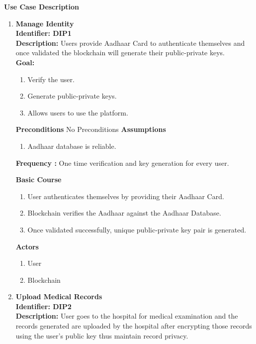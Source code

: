 \textbf{Use Case Description}
\begin{enumerate}
	\item \textbf{Manage Identity } \\
	      \textbf{ Identifier: DIP1} \\
	      \textbf{ Description:} 
	      Users provide Aadhaar Card to authenticate themselves and once validated the blockchain will generate their public-private keys.\\
	      \textbf{Goal:}
	      \begin{enumerate}
	      	\item  Verify the user.
	      	\item  Generate public-private keys.
	      	\item  Allows users to use the platform.
	      \end{enumerate}
	      \textbf{Preconditions} No Preconditions
	      \textbf{Assumptions}
	      \begin{enumerate}
	      	\item Aadhaar database is reliable.
	      \end{enumerate}
	      \textbf{Frequency :} One time verification and key generation for every user.
	      	                  
	      	                  
	      \textbf{Basic Course}
	      \begin{enumerate}
	      	\item	User authenticates themselves by providing their Aadhaar Card.
	      	\item	Blockchain verifies the Aadhaar against the Aadhaar Database.
	      	\item	Once validated successfully, unique public-private key pair is generated.
	      \end{enumerate}
	      \textbf{Actors}
	      \begin{enumerate}
	      	\item  User
	      	\item Blockchain
	      \end{enumerate}
	      	                  
	\item \textbf{Upload Medical Records } \\
	      \textbf{ Identifier: DIP2} \\
	      \textbf{ Description:} User goes to the hospital for medical examination and the records generated are uploaded by the hospital after encrypting those records using the user’s public key thus maintain record privacy.
	      	              

\end{enumerate}
